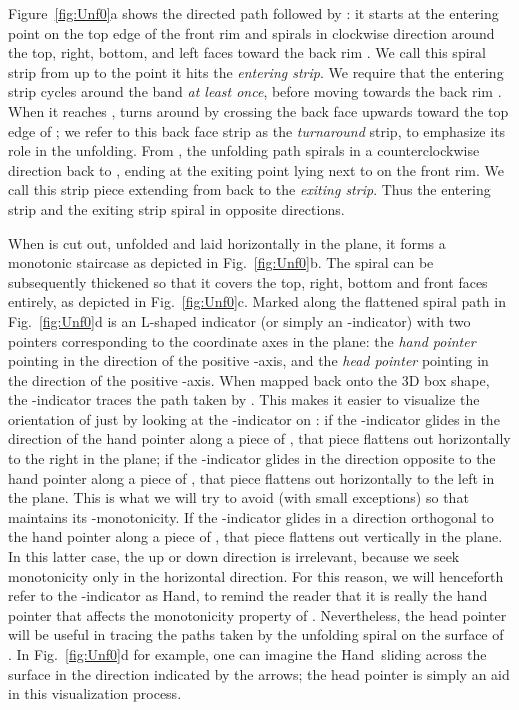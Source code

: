\documentclass[11pt]{article}
\newcommand\hand{{\sc Hand}}
\begin{document}
Figure~\ref{fig:Unf0}a shows the directed path followed by : it starts
at the entering point  on the top edge of the front rim  and spirals in clockwise
direction around the top, right, bottom, and left faces toward the back rim .
We call this spiral strip from  up to the point it hits  the \emph{entering strip}.
We require that the entering strip cycles around the band \emph{at least once}, before
moving towards the back rim .
When it reaches ,  turns around by crossing the back face upwards toward
the top edge of ; we refer to this back face strip as the \emph{turnaround} strip, to emphasize its role in the unfolding. From , the unfolding path  spirals in a counterclockwise direction back to , ending at
the exiting point  lying next to  on the front rim. We call this strip piece extending
from  back to  the \emph{exiting strip}. Thus the entering strip and the exiting
strip spiral in opposite directions.

When  is cut out, unfolded and laid horizontally
in the plane, it forms a monotonic staircase  as depicted in Fig.~\ref{fig:Unf0}b. The spiral can be subsequently thickened so that it covers the top, right, bottom and front faces entirely, as depicted in Fig.~\ref{fig:Unf0}c. Marked along the flattened spiral path in Fig.~\ref{fig:Unf0}d is an L-shaped
indicator (or simply an -indicator) with two pointers corresponding to the coordinate axes in the plane:
the \emph{hand pointer} pointing in the direction of the positive -axis, and the
\emph{head pointer} pointing in the direction of the positive -axis. When mapped back onto the
3D box shape, the -indicator traces the path taken by . This makes it easier to visualize the orientation of  just by looking at the -indicator on : if the -indicator glides in the direction of the hand pointer along a piece of , that piece flattens out horizontally to the right in the plane; if the -indicator glides in the direction opposite to the hand pointer along a piece of , that piece flattens out horizontally to the left in the plane. This is what we will try to avoid (with small exceptions) so that  maintains its -monotonicity. If the -indicator glides in a direction orthogonal to the hand pointer along a piece of , that piece flattens out vertically in the plane. In this latter case, the up or down direction is irrelevant, because we seek monotonicity only in the horizontal direction. For this reason, we will henceforth refer to the -indicator as \hand, to remind the reader that it is really the hand pointer that affects the monotonicity property of . Nevertheless, the head pointer will be useful in tracing the paths taken by the unfolding spiral on the surface of . In Fig.~\ref{fig:Unf0}d for example, one can imagine the \hand\ sliding across the surface in the direction indicated by the arrows; the head pointer is simply an aid in this visualization process.
\end{document}
